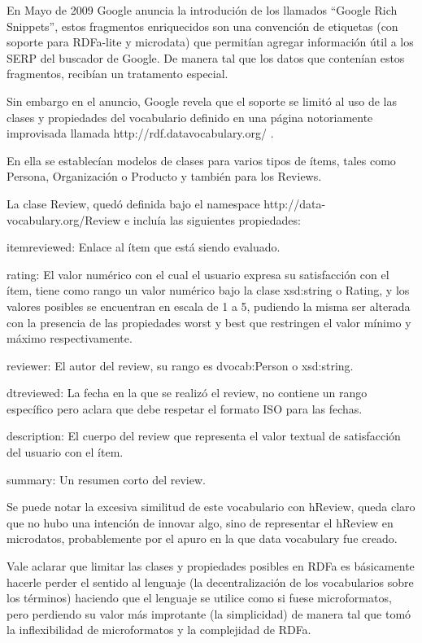 En Mayo de 2009 Google anuncia la introdución de los llamados ``Google Rich Snippets'', estos fragmentos enriquecidos son una convención 
de etiquetas (con soporte para RDFa-lite y microdata) que permitían agregar información útil a los SERP del buscador de Google. De manera tal 
que los datos que contenían estos fragmentos, recibían un tratamento especial.

Sin embargo en el anuncio, Google revela que el soporte se limitó al uso de las clases y propiedades del vocabulario definido en una página 
notoriamente improvisada llamada http://rdf.datavocabulary.org/ . 

En ella se establecían modelos de clases para varios tipos de ítems, tales como Persona, Organización o Producto y también para los Reviews.

La clase Review, quedó definida bajo el namespace http://data-vocabulary.org/Review e incluía las siguientes propiedades:

itemreviewed: Enlace al ítem que está siendo evaluado.

rating: El valor numérico con el cual el usuario expresa su satisfacción con el ítem, tiene como rango un valor numérico bajo la clase 
xsd:string o Rating, y los valores posibles se encuentran en escala de 1 a 5, pudiendo la misma ser alterada con la presencia de las 
propiedades worst y best que restringen el valor mínimo y máximo respectivamente.

reviewer: El autor del review, su rango es dvocab:Person o xsd:string.

dtreviewed: La fecha en la que se realizó el review, no contiene un rango específico pero aclara que debe respetar el formato 
ISO para las fechas.

description: El cuerpo del review que representa el valor textual de satisfacción del usuario con el ítem.

summary: Un resumen corto del review.

Se puede notar la excesiva similitud de este vocabulario con hReview, queda claro que no hubo una intención de innovar algo, 
sino de representar el hReview en microdatos, probablemente por el apuro en la que data vocabulary fue creado.

Vale aclarar que limitar las clases y propiedades posibles en RDFa es básicamente hacerle perder el sentido al lenguaje 
(la decentralización de los vocabularios sobre los términos) haciendo que el lenguaje se utilice como si fuese microformatos, 
pero perdiendo su valor más improtante (la simplicidad) de manera tal que tomó la inflexibilidad de microformatos y la complejidad 
de RDFa.

